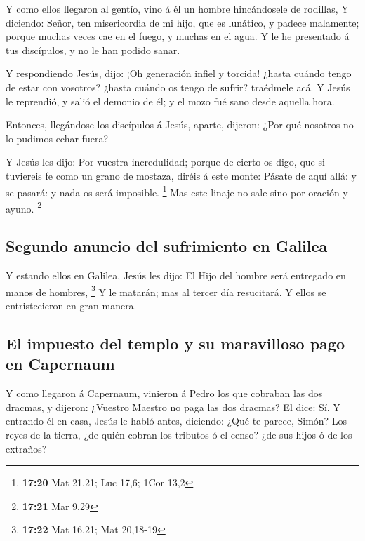  Y como ellos llegaron al gentío, vino á él un hombre
hincándosele de rodillas,  Y diciendo: Señor, ten
misericordia de mi hijo, que es lunático, y padece malamente; porque
muchas veces cae en el fuego, y muchas en el agua.  Y le he
presentado á tus discípulos, y no le han podido sanar.

 Y respondiendo Jesús, dijo: ¡Oh generación infiel y
torcida! ¿hasta cuándo tengo de estar con vosotros? ¿hasta cuándo os
tengo de sufrir? traédmele acá.  Y Jesús le reprendió, y
salió el demonio de él; y el mozo fué sano desde aquella hora.

 Entonces, llegándose los discípulos á Jesús, aparte,
dijeron: ¿Por qué nosotros no lo pudimos echar fuera?

 Y Jesús les dijo: Por vuestra incredulidad; porque de
cierto os digo, que si tuviereis fe como un grano de mostaza, diréis á
este monte: Pásate de aquí allá: y se pasará: y nada os será imposible.
\footnote{\textbf{17:20} Mat 21,21; Luc 17,6; 1Cor 13,2} 
Mas este linaje no sale sino por oración y ayuno. \footnote{\textbf{17:21}
  Mar 9,29}

\hypertarget{segundo-anuncio-del-sufrimiento-en-galilea}{%
\subsection{Segundo anuncio del sufrimiento en
Galilea}\label{segundo-anuncio-del-sufrimiento-en-galilea}}

 Y estando ellos en Galilea, Jesús les dijo: El Hijo del
hombre será entregado en manos de hombres, \footnote{\textbf{17:22} Mat
  16,21; Mat 20,18-19}  Y le matarán; mas al tercer día
resucitará. Y ellos se entristecieron en gran manera.

\hypertarget{el-impuesto-del-templo-y-su-maravilloso-pago-en-capernaum}{%
\subsection{El impuesto del templo y su maravilloso pago en
Capernaum}\label{el-impuesto-del-templo-y-su-maravilloso-pago-en-capernaum}}

 Y como llegaron á Capernaum, vinieron á Pedro los que
cobraban las dos dracmas, y dijeron: ¿Vuestro Maestro no paga las dos
dracmas?  El dice: Sí. Y entrando él en casa, Jesús le
habló antes, diciendo: ¿Qué te parece, Simón? Los reyes de la tierra,
¿de quién cobran los tributos ó el censo? ¿de sus hijos ó de los
extraños?

